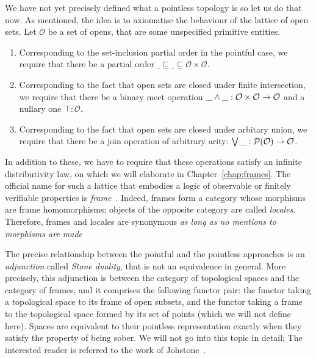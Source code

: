 We have not yet precisely defined what a pointless topology is so let us do that now. As
mentioned, the idea is to axiomatise the behaviour of the lattice of open sets. Let
$\mathcal{O}$ be a set of opens, that are some unspecified primitive entities.
\begin{enumerate}
  \item Corresponding to the set-inclusion partial order in the pointful case, we require
    that there be a partial order $\_\sqsubseteq\_ \subseteq \mathcal{O} \times \mathcal{O}$.
  \item Corresponding to the fact that open sets are closed under finite intersection, we
    require that there be a binary meet operation $\_ \wedge \_ : \mathcal{O} \times
    \mathcal{O} \rightarrow \mathcal{O}$ and a nullary one $\top : \mathcal{O}$.
  \item Corresponding to the fact that open sets are closed under arbitary union, we
    require that there be a join operation of arbitrary arity: $\bigvee{}\_ :
    \mathcal{P}(\mathcal{O}) \rightarrow \mathcal{O}$.
\end{enumerate}
In addition to these, we have to require that these operations satisfy an infinite
distributivity law, on which we will elaborate in Chapter~\ref{chap:frames}. The official
name for such a lattice that embodies a logic of observable or finitely verifiable
properties is \emph{frame}~\cite{vickers}. Indeed, frames form a category whose morphisms
are frame homomorphisms; objects of the opposite category are called \emph{locales}.
Therefore, frames and locales are synonymous
\emph{as long as no mentions to morphisms are made}~\cite{vickers, stone-spaces}

The precise relationship between the pointful and the pointless approaches is an
\emph{adjunction} called \emph{Stone duality}, that is not an equivalence in general. More
precisely, this adjunction is between the category of topological spaces and the category
of frames, and it comprises the following functor pair: the functor taking a topological
space to its frame of open subsets, and the functor taking a frame to the topological
space formed by its set of points (which we will not define here). Spaces are equivalent
to their pointless representation exactly when they satisfy the property of being sober.
We will not go into this topic in detail; The interested reader is referred to the work of
Johstone~\cite{johnstone-the-point, stone-spaces}.


